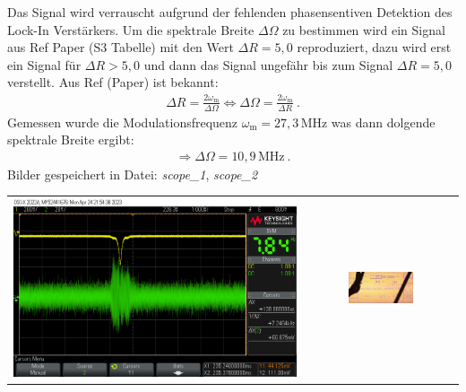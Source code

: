 Das Signal wird verrauscht aufgrund der fehlenden phasensentiven Detektion des Lock-In Verstärkers. Um die spektrale Breite $\Delta \Omega$ zu bestimmen wird ein Signal aus Ref Paper (S3 Tabelle) mit den Wert $\Delta R = 5,0$ reproduziert, dazu wird erst ein Signal für $\Delta R > 5,0$ und dann das Signal ungefähr bis zum Signal  $\Delta R = 5,0$ verstellt. Aus Ref (Paper) ist bekannt:
\begin{gather}
    \Delta R = \frac{2 \omega_\mathrm{m}}{\Delta \Omega} \Leftrightarrow \Delta \Omega = \frac{2 \omega_\mathrm{m}}{\Delta R}~.
\end{gather}
Gemessen wurde die Modulationsfrequenz $\omega_\mathrm{m} = 27,3$\,MHz was dann dolgende spektrale Breite ergibt: 
\begin{gather}    
    \Rightarrow \boxed{\Delta \Omega = 10,9\,\mathrm{MHz}}~.
\end{gather}
Bilder gespeichert in Datei: \textit{scope\_1}, \textit{scope\_2}

\begin{center}
    \captionsetup{type=figure}
    \begin{tabular}{c c}
        \includegraphics[scale=0.25]{Bilder/Signal-Rausch/scope_2.png} & \includegraphics[width=0.45\textwidth]{Bilder/Signal-Rausch/signal-rausch_paper_hf-generator.jpg}
    \end{tabular}
    \label{fig:specBreite}
\end{center}

